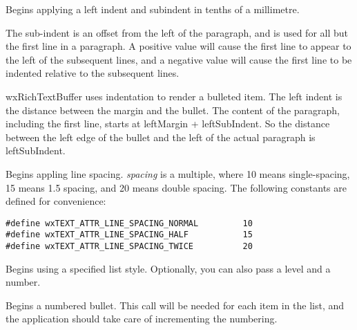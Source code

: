 
Begins applying a left indent and subindent in tenths of a millimetre.

The sub-indent is an offset from the left of the paragraph, and is used for all but the
first line in a paragraph. A positive value will cause the first line to appear to the left
of the subsequent lines, and a negative value will cause the first line to be indented
relative to the subsequent lines.

wxRichTextBuffer uses indentation to render a bulleted item. The left indent is the distance between
the margin and the bullet. The content of the paragraph, including the first line, starts
at leftMargin + leftSubIndent. So the distance between the left edge of the bullet and the
left of the actual paragraph is leftSubIndent.

\label{wxrichtextctrlbeginlinespacing}


Begins appling line spacing. {\it spacing} is a multiple, where 10 means single-spacing,
15 means 1.5 spacing, and 20 means double spacing. The following constants are
defined for convenience:

{\small
\begin{verbatim}
#define wxTEXT_ATTR_LINE_SPACING_NORMAL         10
#define wxTEXT_ATTR_LINE_SPACING_HALF           15
#define wxTEXT_ATTR_LINE_SPACING_TWICE          20
\end{verbatim}
}

\label{wxrichtextctrlbeginliststyle}


Begins using a specified list style. Optionally, you can also pass a level and a number.

\label{wxrichtextctrlbeginnumberedbullet}


Begins a numbered bullet. This call will be needed for each item in the list, and the
application should take care of incrementing the numbering.

